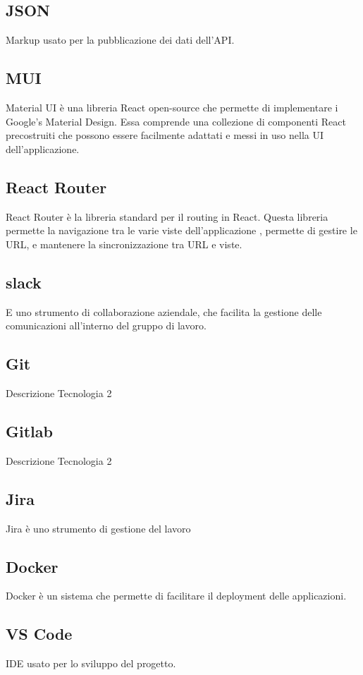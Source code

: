 \subsection*{JSON}
Markup usato per la pubblicazione dei dati dell’API.

\subsection*{MUI}
Material UI è una libreria React open-source che permette di implementare i Google's Material Design. Essa comprende una collezione di componenti React precostruiti che possono essere facilmente adattati e messi in uso nella UI dell'applicazione.

\subsection*{React Router}
React Router è la libreria standard per il routing in React. Questa libreria permette la navigazione tra le varie viste dell'applicazione , permette di gestire le URL, e mantenere la sincronizzazione tra URL e viste.

\subsection*{slack}
E uno strumento di collaborazione aziendale, che facilita la gestione delle comunicazioni all'interno del gruppo di lavoro.

\subsection*{Git}
Descrizione Tecnologia 2

\subsection*{Gitlab}
Descrizione Tecnologia 2

\subsection*{Jira}
Jira è uno strumento di gestione del lavoro

\subsection*{Docker}
Docker è un sistema che permette di facilitare il deployment delle applicazioni.

\subsection*{VS Code}
IDE usato per lo sviluppo del progetto.

